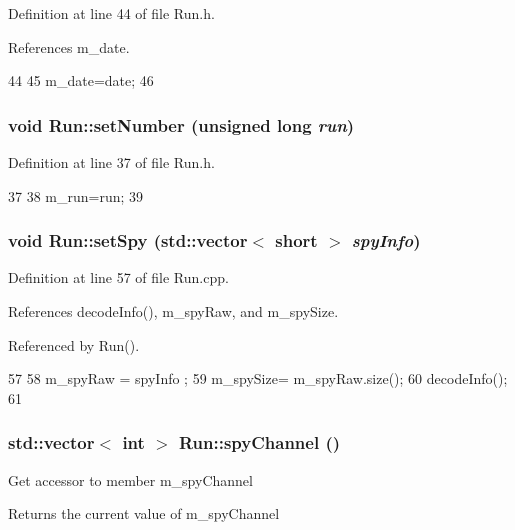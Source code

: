 Definition at line 44 of file Run.h.

References m\_\-date.


\begin{DoxyCode}
44                                   {
45     m_date=date;
46   }  
\end{DoxyCode}
\hypertarget{classRun_a0ad734e3ee75d2b58631e5b237a55f5d}{
\subsubsection[{setNumber}]{\setlength{\rightskip}{0pt plus 5cm}void Run::setNumber (unsigned long {\em run})}}
\label{classRun_a0ad734e3ee75d2b58631e5b237a55f5d}


Definition at line 37 of file Run.h.


\begin{DoxyCode}
37                                    {
38     m_run=run;
39   }
\end{DoxyCode}
\hypertarget{classRun_a391d15d3d908d3d011214dba1a075277}{
\subsubsection[{setSpy}]{\setlength{\rightskip}{0pt plus 5cm}void Run::setSpy (std::vector$<$ short $>$ {\em spyInfo})}}
\label{classRun_a391d15d3d908d3d011214dba1a075277}


Definition at line 57 of file Run.cpp.

References decodeInfo(), m\_\-spyRaw, and m\_\-spySize.

Referenced by Run().


\begin{DoxyCode}
57                                              {
58   m_spyRaw = spyInfo ;
59   m_spySize= m_spyRaw.size();
60   decodeInfo();
61 }
\end{DoxyCode}
\hypertarget{classRun_a9ab05b137c79436688d59fba008f8078}{
\subsubsection[{spyChannel}]{\setlength{\rightskip}{0pt plus 5cm}std::vector$<$ int $>$ Run::spyChannel ()}}
\label{classRun_a9ab05b137c79436688d59fba008f8078}
Get accessor to member m\_\-spyChannel \begin{DoxyReturn}{Returns}
the current value of m\_\-spyChannel 
\end{DoxyReturn}


